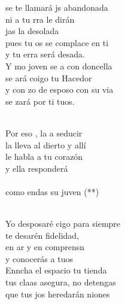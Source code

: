 \documentclass[12pt]{article}
\begin{document}
\begin{multicols*}{2}
\begin{cancion}%
	 se te llamará js abandonada \\
	ni a tu rra le dirán \\
	jas la desolada \\
	pues tu os se complace en ti \\
	y tu erra será desada.\\
	Y mo joven se a con doncella\\
	se ará coigo tu Hacedor\\
	y con zo de esposo con su via\\
	se zará por ti tuos. \\\jump\\
	\begin{chorus}%
	Por eso , la  a seducir\\
	la lleva al dierto y allí\\
	le habla a tu corazón \\
	y ella  responderá\\
{}\vspace*{-0.4cm}\\
	como endas  su juven (**)\\
	\end{chorus}%
	\jump\\
	Yo  desposaré cigo para siempre\\
	te desarén fidelidad,\\
	en ar y en comprensn \\
	y  conocerás a tuos\\
	Enncha el espacio tu tienda\\
	tus claas asegura, no  detengas\\
	que tus jos heredarán niones\\

\end{cancion}
\end{multicols*}
\end{document}
